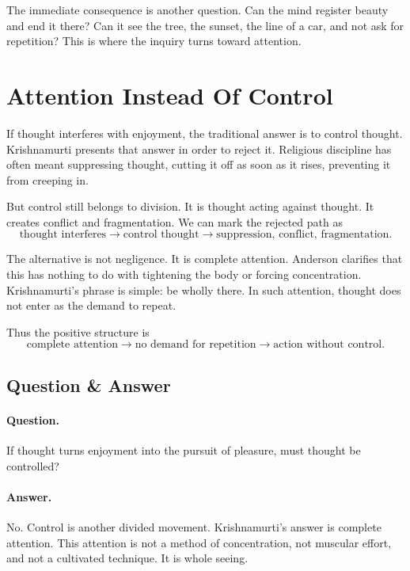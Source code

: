 The immediate consequence is another question. Can the mind register beauty and end it there? Can it see the tree, the sunset, the line of a car, and not ask for repetition? This is where the inquiry turns toward attention.

\section{Attention Instead Of Control}

If thought interferes with enjoyment, the traditional answer is to control thought. Krishnamurti presents that answer in order to reject it. Religious discipline has often meant suppressing thought, cutting it off as soon as it rises, preventing it from creeping in.

But control still belongs to division. It is thought acting against thought. It creates conflict and fragmentation. We can mark the rejected path as
\begin{equation}
\text{thought interferes}
\longrightarrow
\text{control thought}
\longrightarrow
\text{suppression, conflict, fragmentation}.
\end{equation}

The alternative is not negligence. It is complete attention. Anderson clarifies that this has nothing to do with tightening the body or forcing concentration. Krishnamurti's phrase is simple: be wholly there. In such attention, thought does not enter as the demand to repeat.

Thus the positive structure is
\begin{equation}
\text{complete attention}
\longrightarrow
\text{no demand for repetition}
\longrightarrow
\text{action without control}.
\end{equation}

\subsection{Question \& Answer}

\paragraph{Question.}
If thought turns enjoyment into the pursuit of pleasure, must thought be controlled?

\paragraph{Answer.}
No. Control is another divided movement. Krishnamurti's answer is complete attention. This attention is not a method of concentration, not muscular effort, and not a cultivated technique. It is whole seeing.

